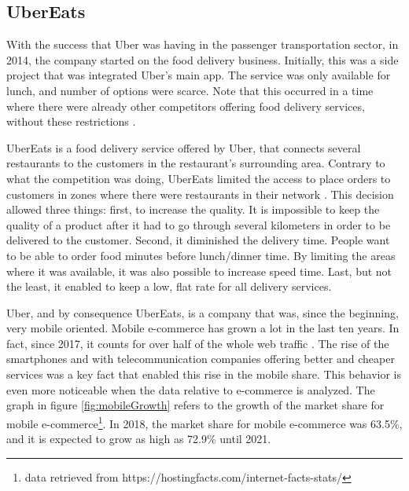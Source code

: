 \subsection{UberEats}
With the success that Uber was having in the passenger transportation sector, in 2014, the company started on the food delivery business. Initially, this was a side project that was integrated Uber's main app. The service was only available for lunch, and number of options were scarce. Note that this occurred in a time where there were already other competitors offering food delivery services, without these restrictions \parencite{whyUberStartedUberEats}. 
\par
UberEats is a food delivery service offered by Uber, that connects several restaurants to the customers in the restaurant's surrounding area. Contrary to what the competition was doing, UberEats limited the access to place orders to customers in zones where there were restaurants in their network \parencite{whyUberStartedUberEats}. This decision allowed three things: first, to increase the quality. It is impossible to keep the quality of a product after it had to go through several kilometers in order to be delivered to the customer. Second, it diminished the delivery time. People want to be able to order food minutes before lunch/dinner time. By limiting the areas where it was available, it was also possible to increase speed time. Last, but not the least, it enabled to keep a low, flat rate for all delivery services.
\par
Uber, and by consequence UberEats, is a company that was, since the beginning, very mobile oriented. Mobile e-commerce has grown a lot in the last ten years. In fact, since 2017, it counts for over half of the whole web traffic \parencite{percentageMobileTraffic}. The rise of the smartphones and with telecommunication companies offering better and cheaper services was a key fact that enabled this rise in the mobile share. This behavior is even more noticeable when the data relative to e-commerce is analyzed. The graph in figure \ref{fig:mobileGrowth} refers to the growth of the market share for mobile e-commerce\footnote{data retrieved from https://hostingfacts.com/internet-facts-stats/}. In 2018, the market share for mobile e-commerce was 63.5\%, and it is expected to grow as high as 72.9\% until 2021.


